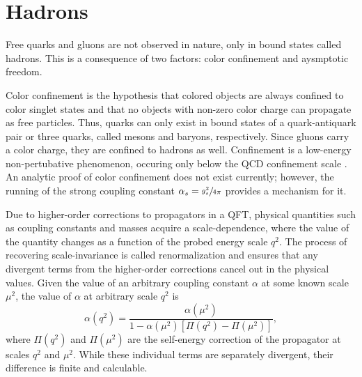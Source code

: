\section{Hadrons}
\label{sec:hadrons}

Free quarks and gluons are not observed in nature, only in bound states called hadrons.
This is a consequence of two factors: color confinement and aysmptotic freedom.

Color confinement is the hypothesis that colored objects are always confined to color singlet states and that no objects with non-zero color charge can propagate as free particles.
Thus, quarks can only exist in bound states of a quark-antiquark pair or three quarks, called mesons and baryons, respectively. 
Since gluons carry a color charge, they are confined to hadrons as well.
Confinement is a low-energy non-pertubative phenomenon, occuring only below the QCD confinement scale \lqcd. 
An analytic proof of color confinement does not exist currently; however, the running of the strong coupling constant $\alpha_s = \sfrac{g_s^2}{4\pi}$ provides a mechanism for it.

Due to higher-order corrections to propagators in a QFT, physical quantities such as coupling constants and masses acquire a scale-dependence, where the value of the quantity changes as a function of the probed energy scale $q^2$.
The process of recovering scale-invariance is called renormalization and ensures that any divergent terms from the higher-order corrections cancel out in the physical values.
Given the value of an arbitrary coupling constant $\alpha$ at some known scale $\mu^2$, the value of $\alpha$ at arbitrary scale $q^2$ is  
\begin{equation}
  \label{eqn:rge}
  \alpha (q^2) = \frac{\alpha(\mu^2)}{1 - \alpha(\mu^2) \left[ \Pi(q^2) - \Pi(\mu^2) \right]},
\end{equation}
where $\Pi(q^2)$ and $\Pi(\mu^2)$ are the self-energy correction of the propagator at scales $q^2$ and $\mu^2$.
While these individual terms are separately divergent, their difference is finite and calculable. 

